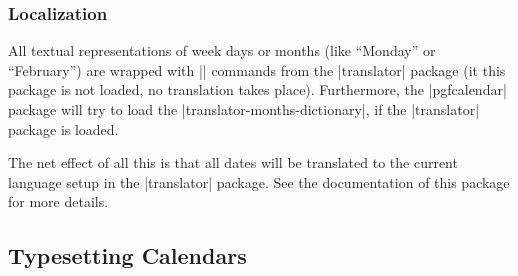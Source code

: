 \subsubsection{Localization}
\label{section-calendar-locale}

All textual representations of week days or months (like ``Monday'' or
``February'') are wrapped with |\translate| commands from the |translator|
package (it this package is not loaded, no translation takes place).
Furthermore, the |pgfcalendar| package will try to load the
|translator-months-dictionary|, if the |translator| package is loaded.

The net effect of all this is that all dates will be translated to the current
language setup in the |translator| package. See the documentation of this
package for more details.


\subsection{Typesetting Calendars}

